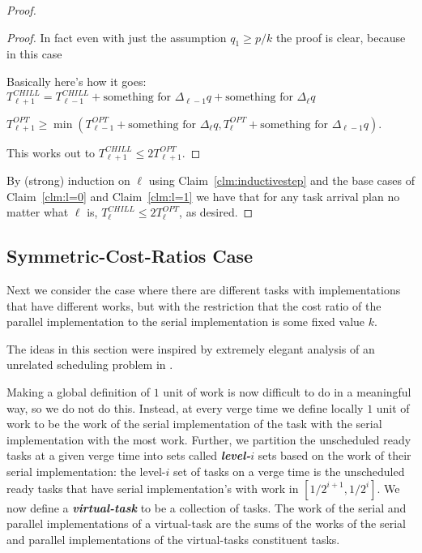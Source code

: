 \documentclass[twocolumn]{article}[11pt]
\newcommand{\defn}[1]{{\textit{\textbf{\boldmath #1}}}\xspace}
\begin{document}
\begin{proof}
\begin{proof}
    In fact even with just the assumption $q_1 \ge p/k$ the proof
    is clear, because in this case

    Basically here's how it goes:
    $T_{\ell+1}^{CHILL} = T_{\ell-1}^{CHILL} + \text{something
    for } \Delta_{\ell-1} q + \text{something for } \Delta_\ell q$

    $T_{\ell+1}^{OPT} \ge \min(T_{\ell-1}^{OPT} + \text{something
    for } \Delta_{\ell} q, T_{\ell}^{OPT} + \text{something for }
    \Delta_{\ell-1} q).$

    This works out to $T_{\ell+1}^{CHILL} \le 2T_{\ell+1}^{OPT}$.
  \end{proof}

  By (strong) induction on $\ell$ using Claim~\ref{clm:inductivestep} and the
  base cases of Claim~\ref{clm:l=0} and Claim~\ref{clm:l=1} we
  have that for any task arrival plan no matter what $\ell$
  is, $T_{\ell}^{CHILL} \le 2T_{\ell}^{OPT}$, as desired.

\end{proof}


\subsection{Symmetric-Cost-Ratios Case}
\label{subsec:symmetriccostratio}
Next we consider the case where there are different tasks with
implementations that have different works, but with the
restriction that the cost ratio of the parallel implementation to
the serial implementation is some fixed value $k$.

The ideas in this section were inspired by extremely elegant
analysis of an unrelated scheduling problem in \cite{bamboo20}.

Making a global definition of $1$ unit of work is now difficult
to do in a meaningful way, so we do not do this. Instead, at
every verge time we define locally $1$ unit of work to be the
work of the serial implementation of the task with the serial
implementation with the most work. 
Further, we partition the unscheduled ready tasks at a given verge time into
sets called \defn{level-$i$} sets based on the work of their serial
implementation: the level-$i$ set of tasks on a verge time is the
unscheduled ready tasks that have serial implementation's with
work in $[1/2^{i+1}, 1/2^{i}]$.
We now define a \defn{virtual-task} to be a collection of tasks.
The work of the serial and parallel implementations of a
virtual-task are the sums of the works of the serial and parallel
implementations of the virtual-tasks constituent tasks.
\end{document}
